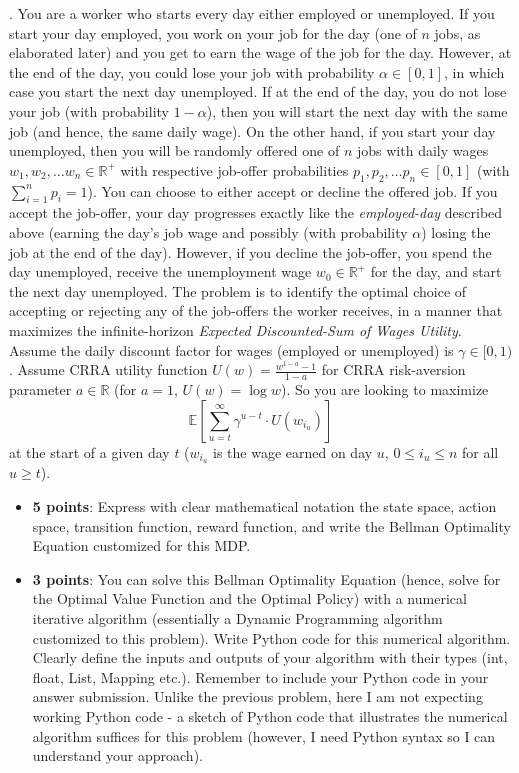 \documentclass[12pt]{exam}
\begin{document}
\begin{questions}
\vspace{3mm}
. You are a worker who starts every day either employed or unemployed. If you start your day employed, you work on your job for the day (one of $n$ jobs, as elaborated later) and you get to earn the wage of the job for the day. However, at the end of the day, you could lose your job with probability $\alpha \in [0,1]$, in which case you start the next day unemployed. If at the end of the day, you do not lose your job (with probability $1-\alpha$), then you will start the next day with the same job (and hence, the same daily wage). On the other hand, if you start your day unemployed, then you will be randomly offered one of $n$ jobs with daily wages $w_1, w_2, \ldots w_n \in \mathbb{R}^+$ with respective job-offer probabilities $p_1, p_2, \ldots p_n \in [0,1]$ (with $\sum_{i=1}^n p_i = 1$). You can choose to either accept or decline the offered job. If you accept the job-offer, your day progresses exactly like the {\em employed-day} described above (earning the day's job wage and possibly (with probability $\alpha$) losing the job at the end of the day). However, if you decline the job-offer, you spend the day unemployed, receive the unemployment wage $w_0 \in \mathbb{R}^+$ for the day, and start the next day unemployed. The problem is to identify the optimal choice of accepting or rejecting any of the job-offers the worker receives, in a manner that maximizes the infinite-horizon {\em Expected Discounted-Sum of Wages Utility}. Assume the daily discount factor for wages (employed or unemployed) is $\gamma \in [0,1)$. Assume CRRA utility function $U(w) = \frac {w^{1-a} - 1} {1-a}$ for CRRA risk-aversion parameter $a \in \mathbb{R}$ (for $a=1$, $U(w) = \log w$). So you are looking to maximize
$$\mathbb{E}[\sum_{u=t}^\infty \gamma^{u-t} \cdot U(w_{i_u})]$$
 at the start of a given day $t$ ($w_{i_u}$ is the wage earned on day $u$, $0\leq i_u \leq n$ for all $u\geq t$).

\begin{itemize}
\item {\bf 5 points}: Express with clear mathematical notation the state space, action space, transition function, reward function, and write the Bellman Optimality Equation customized for this MDP.

\item {\bf 3 points}: You can solve this Bellman Optimality Equation (hence, solve for the Optimal Value Function and the Optimal Policy) with a numerical iterative algorithm (essentially a Dynamic Programming algorithm customized to this problem). Write Python code for this numerical algorithm. Clearly define the inputs and outputs of your algorithm with their types (int, float, List, Mapping etc.). Remember to include your Python code in your answer submission. Unlike the previous problem, here I am not expecting working Python code - a sketch of Python code that illustrates the numerical algorithm suffices for this problem (however, I need Python syntax so I can understand your approach).


\end{itemize}
\end{questions}
\end{document}
